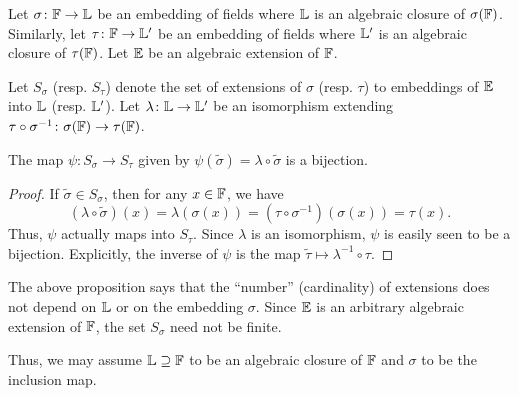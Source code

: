 \begin{theorem} \label{thm:cardinality-of-extension}
    Let $\sigma \colon \mathbb{F} \to \mathbb{L}$ be an embedding of fields where $\mathbb{L}$ is an algebraic closure of $\sigma(\mathbb{F})$. Similarly, let $\tau \colon \mathbb{F} \to \mathbb{L}^{\prime}$ be an embedding of fields where $\mathbb{L}^{\prime}$ is an algebraic closure of $\tau(\mathbb{F})$. Let $\mathbb{E}$ be an algebraic extension of $\mathbb{F}$.
    
    Let $S_{\sigma}$ (resp. $S_{\tau}$) denote the set of extensions of $\sigma$ (resp. $\tau$) to embeddings of $\mathbb{E}$ into $\mathbb{L}$ (resp. $\mathbb{L}^{\prime}$). Let $\lambda \colon \mathbb{L} \to \mathbb{L}^{\prime}$ be an isomorphism extending $\tau \circ \sigma^{-1} \colon \sigma(\mathbb{F}) \to \tau(\mathbb{F})$.
    
    The map $\psi \colon S_{\sigma} \to S_{\tau}$ given by $\psi(\widetilde{\sigma}) = \lambda \circ \widetilde{\sigma}$ is a bijection.
    
    \begin{center}
    \end{center}                               
\end{theorem}
\begin{proof}
    If $\widetilde{\sigma} \in S_{\sigma}$, then for any $x \in \mathbb{F}$, we have
    \[
        (\lambda \circ \widetilde{\sigma})(x) = \lambda(\sigma(x)) = (\tau \circ \sigma^{-1})(\sigma(x)) = \tau(x).
    \]
    Thus, $\psi$ actually maps into $S_{\tau}$. Since $\lambda$ is an isomorphism, $\psi$ is easily seen to be a bijection. Explicitly, the inverse of $\psi$ is the map $\widetilde{\tau} \mapsto \lambda^{-1} \circ \tau$.
\end{proof}

\begin{rem}
    The above proposition says that the ``number'' (cardinality) of extensions does not depend on $\mathbb{L}$ or on the embedding $\sigma$. Since $\mathbb{E}$ is an arbitrary algebraic extension of $\mathbb{F}$, the set $S_{\sigma}$ need not be finite. 
    
    Thus, we may assume $\mathbb{L} \supseteq \mathbb{F}$ to be an algebraic closure of $\mathbb{F}$ and $\sigma$ to be the inclusion map.
\end{rem}

